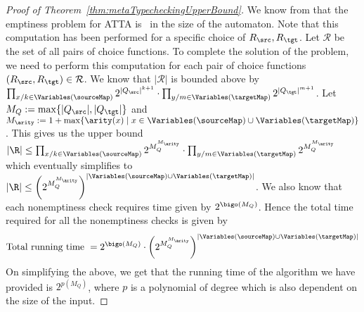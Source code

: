 \begin{proof}[Proof of Theorem~\ref{thm:metaTypecheckingUpperBound}]
    We know from \cite{tata} that the emptiness problem for ATTA is \exptc\ in the size of the automaton. Note that this computation has been performed for a specific choice of $R_\src, R_\tgt$. Let $\mathcal{R}$ be the set of all pairs of choice functions. To complete the solution of the problem, we need to perform this computation for each pair of choice functions $(R_\src, R_\tgt) \in \mathcal{R}$. We know that $|\mathcal{R}|$ is bounded above by $\prod_{x/k \in \Variables(\sourceMap)}2^{|Q_\src|^{k+1}} \cdot \prod_{y/m \in \Variables(\targetMap)}2^{|Q_\tgt|^{m+1}}$. Let $M_Q := \max\{|Q_\src|, |Q_\tgt|\}$ and $M_\arity := 1+\max\{\arity(x) \mid x \in \Variables(\sourceMap) \cup \Variables(\targetMap)\}$. This gives us the upper bound $|\R| \leq \prod_{x/k \in \Variables(\sourceMap)}2^{M_Q^{M_\arity}} \cdot \prod_{y/m \in \Variables(\targetMap)}2^{M_Q^{M_\arity}}$ which eventually simplifies to $|\R| \leq \left(2^{M_Q^{M_\arity}}\right)^{|\Variables(\sourceMap) \cup \Variables(\targetMap)|}$. We also know that each nonemptiness check requires time given by $2^{\bigo(M_Q)}$. Hence the total time required for all the nonemptiness checks is given by
    \[ \mbox{Total running time } = 2^{\bigo(M_Q)} \cdot \left(2^{M_Q^{M_\arity}}\right)^{|\Variables(\sourceMap) \cup \Variables(\targetMap)|} \]
    On simplifying the above, we get that the running time of the algorithm we have provided is $2^{p(M_Q)}$, where $p$ is a polynomial of degree which is also dependent on the size of the input.
\end{proof}